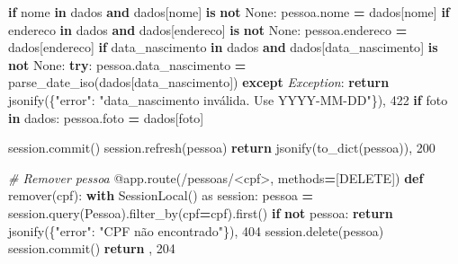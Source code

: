 \documentclass[
]{book}
\newenvironment{Shaded}{\begin{snugshade}}{\end{snugshade}}
\newcommand{\AttributeTok}[1]{\textcolor[rgb]{0.13,0.29,0.53}{#1}}
\newcommand{\CommentTok}[1]{\textcolor[rgb]{0.56,0.35,0.01}{\textit{#1}}}
\newcommand{\ControlFlowTok}[1]{\textcolor[rgb]{0.13,0.29,0.53}{\textbf{#1}}}
\newcommand{\DecValTok}[1]{\textcolor[rgb]{0.00,0.00,0.81}{#1}}
\newcommand{\ImportTok}[1]{#1}
\newcommand{\KeywordTok}[1]{\textcolor[rgb]{0.13,0.29,0.53}{\textbf{#1}}}
\newcommand{\NormalTok}[1]{#1}
\newcommand{\OperatorTok}[1]{\textcolor[rgb]{0.81,0.36,0.00}{\textbf{#1}}}
\newcommand{\PreprocessorTok}[1]{\textcolor[rgb]{0.56,0.35,0.01}{\textit{#1}}}
\newcommand{\StringTok}[1]{\textcolor[rgb]{0.31,0.60,0.02}{#1}}
\newcommand{\VariableTok}[1]{\textcolor[rgb]{0.00,0.00,0.00}{#1}}
\begin{document}
\begin{Shaded}
\begin{Highlighting}[]
        \ControlFlowTok{if} \StringTok{\textquotesingle{}nome\textquotesingle{}} \KeywordTok{in}\NormalTok{ dados }\KeywordTok{and}\NormalTok{ dados[}\StringTok{\textquotesingle{}nome\textquotesingle{}}\NormalTok{] }\KeywordTok{is} \KeywordTok{not} \VariableTok{None}\NormalTok{:}
\NormalTok{            pessoa.nome }\OperatorTok{=}\NormalTok{ dados[}\StringTok{\textquotesingle{}nome\textquotesingle{}}\NormalTok{]}
        \ControlFlowTok{if} \StringTok{\textquotesingle{}endereco\textquotesingle{}} \KeywordTok{in}\NormalTok{ dados }\KeywordTok{and}\NormalTok{ dados[}\StringTok{\textquotesingle{}endereco\textquotesingle{}}\NormalTok{] }\KeywordTok{is} \KeywordTok{not} \VariableTok{None}\NormalTok{:}
\NormalTok{            pessoa.endereco }\OperatorTok{=}\NormalTok{ dados[}\StringTok{\textquotesingle{}endereco\textquotesingle{}}\NormalTok{]}
        \ControlFlowTok{if} \StringTok{\textquotesingle{}data\_nascimento\textquotesingle{}} \KeywordTok{in}\NormalTok{ dados }\KeywordTok{and}\NormalTok{ dados[}\StringTok{\textquotesingle{}data\_nascimento\textquotesingle{}}\NormalTok{] }\KeywordTok{is} \KeywordTok{not} \VariableTok{None}\NormalTok{:}
            \ControlFlowTok{try}\NormalTok{:}
\NormalTok{                pessoa.data\_nascimento }\OperatorTok{=}\NormalTok{ parse\_date\_iso(dados[}\StringTok{\textquotesingle{}data\_nascimento\textquotesingle{}}\NormalTok{])}
            \ControlFlowTok{except} \PreprocessorTok{Exception}\NormalTok{:}
                \ControlFlowTok{return}\NormalTok{ jsonify(\{}\StringTok{"error"}\NormalTok{: }\StringTok{"data\_nascimento inválida. Use YYYY{-}MM{-}DD"}\NormalTok{\}), }\DecValTok{422}
        \ControlFlowTok{if} \StringTok{\textquotesingle{}foto\textquotesingle{}} \KeywordTok{in}\NormalTok{ dados:}
\NormalTok{            pessoa.foto }\OperatorTok{=}\NormalTok{ dados[}\StringTok{\textquotesingle{}foto\textquotesingle{}}\NormalTok{]}

\NormalTok{        session.commit()}
\NormalTok{        session.refresh(pessoa)}
        \ControlFlowTok{return}\NormalTok{ jsonify(to\_dict(pessoa)), }\DecValTok{200}

\CommentTok{\# Remover pessoa}
\AttributeTok{@app.route}\NormalTok{(}\StringTok{\textquotesingle{}/pessoas/\textless{}cpf\textgreater{}\textquotesingle{}}\NormalTok{, methods}\OperatorTok{=}\NormalTok{[}\StringTok{\textquotesingle{}DELETE\textquotesingle{}}\NormalTok{])}
\KeywordTok{def}\NormalTok{ remover(cpf):}
    \ControlFlowTok{with}\NormalTok{ SessionLocal() }\ImportTok{as}\NormalTok{ session:}
\NormalTok{        pessoa }\OperatorTok{=}\NormalTok{ session.query(Pessoa).filter\_by(cpf}\OperatorTok{=}\NormalTok{cpf).first()}
        \ControlFlowTok{if} \KeywordTok{not}\NormalTok{ pessoa:}
            \ControlFlowTok{return}\NormalTok{ jsonify(\{}\StringTok{"error"}\NormalTok{: }\StringTok{"CPF não encontrado"}\NormalTok{\}), }\DecValTok{404}
\NormalTok{        session.delete(pessoa)}
\NormalTok{        session.commit()}
        \ControlFlowTok{return} \StringTok{\textquotesingle{}\textquotesingle{}}\NormalTok{, }\DecValTok{204}


\end{Highlighting}
\end{Shaded}
\end{document}
